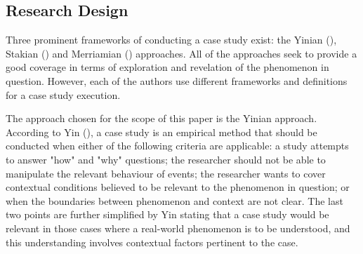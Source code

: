 \documentclass[11pt,a4paper]{article}
\begin{document}
{{%

\subsection{Research Design}
\vspace{-1mm}
\par
Three prominent frameworks of conducting a case study exist: the Yinian (\citeyear{yinCaseStudyResearch2017}), Stakian (\citeyear{stakeArtCaseStudy1995}) and Merriamian (\citeyear{merriamQualitativeResearchCase1998}) approaches. All of the approaches seek to provide a good coverage in terms of exploration and revelation of the phenomenon in question. However, each of the authors use different frameworks and definitions for a case study execution. \par 
The approach chosen for the scope of this paper is the Yinian approach. According to Yin (\citeyear{yinCaseStudyResearch2017}), a case study is an empirical method that should be conducted when either of the following criteria are applicable: a study attempts to answer "how" and "why" questions; the researcher should not be able to manipulate the relevant behaviour of events; the researcher wants to cover contextual conditions believed to be relevant to the phenomenon in question; or when the boundaries between phenomenon and context are not clear. The last two points are further simplified by Yin stating that a case study would be relevant in those cases where a real-world phenomenon is to be understood, and this understanding involves contextual factors pertinent to the case. \par
}}
\end{document}
